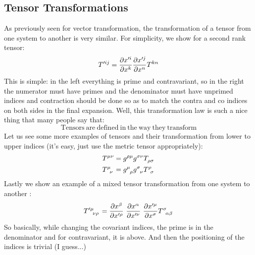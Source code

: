 \subsection{Tensor Transformations}
As previously seen for vector transformation, the transformation of a tensor from one system to another is very similar. For simplicity, we show for a second rank tensor:
$$\tensor{T }{^{\prime ij}} = \pdv{x^{\prime i}}{x^k} \pdv{x^{\prime j}}{x^n} \tensor{T}{^{kn}}$$
This is simple: in the left everything is prime and contravariant, so in the right the numerator must have primes and the denominator must have unprimed indices and contraction should be done so as to match the contra and co indices on both sides in the final expansion. Well, this transformation law is such a nice thing that many people say that: 
$$\boxed{\mathrm{Tensors\ are \ defined\ in\ the\ way\ they\ transform}}$$
Let us see some more examples of tensors and their transformation from lower to upper indices (it's easy, just use the metric tensor appropriately):
\begin{align*}
    \tensor{T}{^\mu^\nu} &=g^{\rho\mu}g^{\sigma\nu} \tensor{T}{_\rho_\sigma}\\
    \tensor{T}{^\mu _\nu} &=\tensor{g}{^\mu _\rho}\tensor{g}{^\sigma _\nu} \tensor{T}{^\rho _\sigma}
\end{align*}
Lastly we show an example of a mixed tensor transformation from one system to another :
\begin{align*}
    \tensor{T}{^{\prime\mu} _\nu _\rho} =\pdv{x^\beta}{x'^\rho}\ \pdv{x^\alpha}{x'^\nu} \ \pdv{x'^\mu}{x^\sigma}  \tensor{T}{^\sigma _\alpha _\beta}
\end{align*}
So basically, while changing the covariant indices, the prime is in the denominator and for contravariant, it is above. And then the positioning of the indices is trivial (I guess...)
